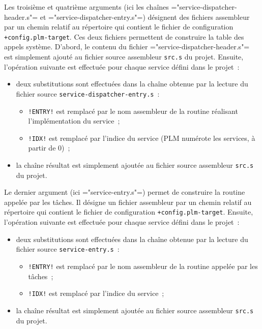 Les troisième et quatrième arguments (ici les chaînes \plm="service-dispatcher-header.s"= et \plm="service-dispatcher-entry.s"=) désignent des fichiers assembleur par un chemin relatif au répertoire qui contient le fichier de configuration \texttt{+config.plm-target}. Ces deux fichiers permettent de construire la table des appels système. D'abord, le contenu du fichier \plm="service-dispatcher-header.s"= est simplement ajouté au fichier source assembleur \texttt{src.s} du projet. Ensuite, l'opération suivante est effectuée pour chaque service défini dans le projet~:
\begin{itemize}
  \item deux substitutions sont effectuées dans la chaîne obtenue par la lecture du fichier source \texttt{service-dispatcher-entry.s}~:
  \begin{itemize}
    \item \texttt{!ENTRY!} est remplacé par le nom assembleur de la routine réalisant l'implémentation du service~;
    \item \texttt{!IDX!} est remplacé par l'indice du service (PLM numérote les services, à partir de $0$)~;
  \end{itemize}
  \item la chaîne résultat est simplement ajoutée au fichier source assembleur \texttt{src.s} du projet.
\end{itemize}

Le dernier argument (ici \plm="service-entry.s"=) permet de construire la routine appelée par les tâches. Il désigne un fichier assembleur par un chemin relatif au répertoire qui contient le fichier de configuration \texttt{+config.plm-target}. Ensuite, l'opération suivante est effectuée pour chaque service défini dans le projet~:
\begin{itemize}
  \item deux substitutions sont effectuées dans la chaîne obtenue par la lecture du fichier source \texttt{service-entry.s}~:
  \begin{itemize}
    \item \texttt{!ENTRY!} est remplacé par le nom assembleur de la routine appelée par les tâches~;
    \item \texttt{!IDX!} est remplacé par l'indice du service~;
  \end{itemize}
  \item la chaîne résultat est simplement ajoutée au fichier source assembleur \texttt{src.s} du projet.
\end{itemize}











